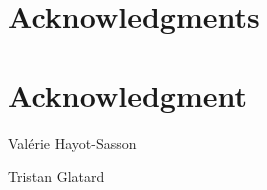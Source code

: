 \documentclass[10pt,journal,compsoc]{IEEEtran}
\begin{document}
\ifCLASSOPTIONcompsoc
  \section*{Acknowledgments}
\else
  \section*{Acknowledgment}
\fi

\ifCLASSOPTIONcaptionsoff
  \newpage
\fi




\begin{IEEEbiography}{Val\'erie Hayot-Sasson}
\end{IEEEbiography}
\begin{IEEEbiography}{Tristan Glatard}
\end{IEEEbiography}
\end{document}
